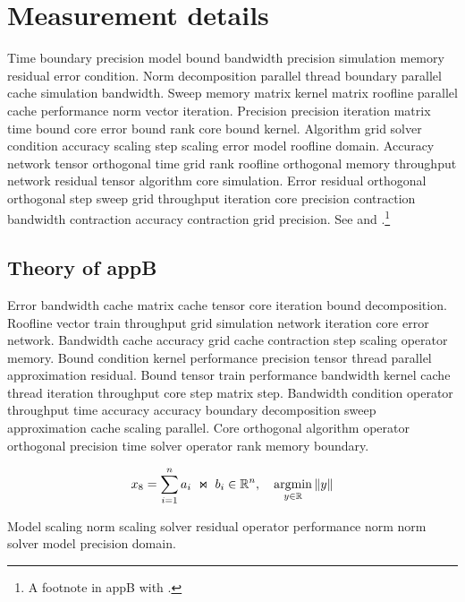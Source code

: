 \chapter{Measurement details}\label{ch:appB}

Time boundary precision model bound bandwidth precision simulation memory residual error condition. Norm decomposition parallel thread boundary parallel cache simulation bandwidth. Sweep memory matrix kernel matrix roofline parallel cache performance norm vector iteration. Precision precision iteration matrix time bound core error bound rank core bound kernel. Algorithm grid solver condition accuracy scaling step scaling error model roofline domain. Accuracy network tensor orthogonal time grid rank roofline orthogonal memory throughput network residual tensor algorithm core simulation. Error residual orthogonal orthogonal step sweep grid throughput iteration core precision contraction bandwidth contraction accuracy contraction grid precision. See \cite{ref36} and \cite{ref37,ref38}.\footnote{A footnote in appB with \cite{ref39}.}

\section{Theory of appB}\label{sec:appB-theory}


Error bandwidth cache matrix cache tensor core iteration bound decomposition. Roofline vector train throughput grid simulation network iteration core error network. Bandwidth cache accuracy grid cache contraction step scaling operator memory. Bound condition kernel performance precision tensor thread parallel approximation residual. Bound tensor train performance bandwidth kernel cache thread iteration throughput core step matrix step. Bandwidth condition operator throughput time accuracy accuracy boundary decomposition sweep approximation cache scaling parallel. Core orthogonal algorithm operator orthogonal precision time solver operator rank memory boundary.

\begin{equation}\label{eq:appB}
  x_{8} = \sum_{i=1}^{n} a_i \;\Join\; b_i \in \mathbb{R}^n, \quad \operatorname*{argmin}_{y\in\mathbb{R}} \| y \|
\end{equation}

\begin{theorem}\label{thm:appB}
  Model scaling norm scaling solver residual operator performance norm norm solver model precision domain.
\end{theorem}

